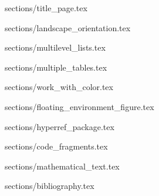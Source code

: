 \documentclass{article}
\begin{document}
{sections/title_page.tex}

{sections/landscape_orientation.tex}

{sections/multilevel_lists.tex}

{sections/multiple_tables.tex}

{sections/work_with_color.tex}

{sections/floating_environment_figure.tex}

{sections/hyperref_package.tex}

{sections/code_fragments.tex}

{sections/mathematical_text.tex}

{sections/bibliography.tex}
\end{document}

